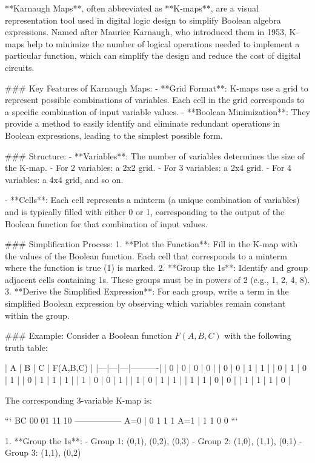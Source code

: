 **Karnaugh Maps**, often abbreviated as **K-maps**, are a visual representation tool used in digital logic design to simplify Boolean algebra expressions. Named after Maurice Karnaugh, who introduced them in 1953, K-maps help to minimize the number of logical operations needed to implement a particular function, which can simplify the design and reduce the cost of digital circuits.

### Key Features of Karnaugh Maps:
- **Grid Format**: K-maps use a grid to represent possible combinations of variables. Each cell in the grid corresponds to a specific combination of input variable values.
- **Boolean Minimization**: They provide a method to easily identify and eliminate redundant operations in Boolean expressions, leading to the simplest possible form.

### Structure:
- **Variables**: The number of variables determines the size of the K-map.
  - For 2 variables: a 2x2 grid.
  - For 3 variables: a 2x4 grid.
  - For 4 variables: a 4x4 grid, and so on.

- **Cells**: Each cell represents a minterm (a unique combination of variables) and is typically filled with either 0 or 1, corresponding to the output of the Boolean function for that combination of input values.

### Simplification Process:
1. **Plot the Function**: Fill in the K-map with the values of the Boolean function. Each cell that corresponds to a minterm where the function is true (1) is marked.
2. **Group the 1s**: Identify and group adjacent cells containing 1s. These groups must be in powers of 2 (e.g., 1, 2, 4, 8).
3. **Derive the Simplified Expression**: For each group, write a term in the simplified Boolean expression by observing which variables remain constant within the group.

### Example:
Consider a Boolean function \( F(A, B, C) \) with the following truth table:

| A | B | C | F(A,B,C) |
|---|---|---|----------|
| 0 | 0 | 0 |    0     |
| 0 | 0 | 1 |    1     |
| 0 | 1 | 0 |    1     |
| 0 | 1 | 1 |    1     |
| 1 | 0 | 0 |    1     |
| 1 | 0 | 1 |    1     |
| 1 | 1 | 0 |    0     |
| 1 | 1 | 1 |    0     |

The corresponding 3-variable K-map is:

```
      BC
      00  01  11  10
   -----------------
A=0 |  0   1   1   1
A=1 |  1   1   0   0
```

1. **Group the 1s**:
   - Group 1: (0,1), (0,2), (0,3)
   - Group 2: (1,0), (1,1), (0,1)
   - Group 3: (1,1), (0,2)

